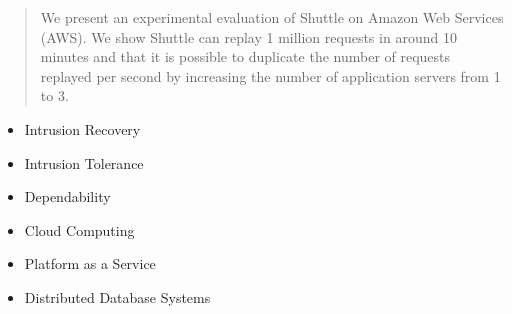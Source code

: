 \begin{abstract}
We present an experimental evaluation of Shuttle on Amazon Web Services (AWS). We show Shuttle can replay 1 million requests in around 10 minutes and that it is possible to duplicate the number of requests replayed per second by increasing the number of application servers from 1 to 3. 



\end{abstract}
\vspace{-2cm}
\begin{keywords}
\begin{itemize}
\vspace{-1cm}
\item Intrusion Recovery
\item Intrusion Tolerance
\item Dependability
\item Cloud Computing
\item Platform as a Service
\item Distributed Database Systems
\end{itemize}
\end{keywords}
\clearpage
\thispagestyle{empty}
\cleardoublepage
